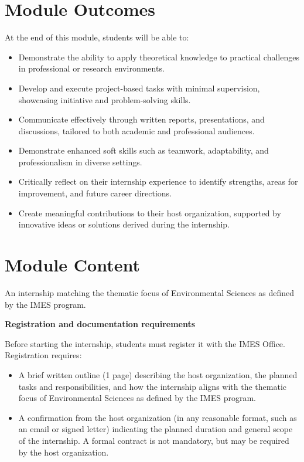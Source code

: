 \documentclass[
  letterpaper,
  10pt,
  openany]{book}
\providecommand{\tightlist}{%
  \setlength{\itemsep}{0pt}\setlength{\parskip}{0pt}}\usepackage{longtable,booktabs,array}
\begin{document}
\section*{Module Outcomes}\label{module-outcomes-3}


At the end of this module, students will be able to:

\begin{itemize}
\tightlist
\item
  Demonstrate the ability to apply theoretical knowledge to practical
  challenges in professional or research environments.
\item
  Develop and execute project-based tasks with minimal supervision,
  showcasing initiative and problem-solving skills.
\item
  Communicate effectively through written reports, presentations, and
  discussions, tailored to both academic and professional audiences.
\item
  Demonstrate enhanced soft skills such as teamwork, adaptability, and
  professionalism in diverse settings.
\item
  Critically reflect on their internship experience to identify
  strengths, areas for improvement, and future career directions.
\item
  Create meaningful contributions to their host organization, supported
  by innovative ideas or solutions derived during the internship.
\end{itemize}

\section*{Module Content}\label{module-content-4}


An internship matching the thematic focus of Environmental Sciences as
defined by the IMES program.

\textbf{Registration and documentation requirements}

Before starting the internship, students must register it with the IMES
Office. Registration requires:

\begin{itemize}
\tightlist
\item
  A brief written outline (1 page) describing the host organization, the
  planned tasks and responsibilities, and how the internship aligns with
  the thematic focus of Environmental Sciences as defined by the IMES
  program.
\item
  A confirmation from the host organization (in any reasonable format,
  such as an email or signed letter) indicating the planned duration and
  general scope of the internship. A formal contract is not mandatory,
  but may be required by the host organization.
\end{itemize}
\end{document}
